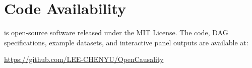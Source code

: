 \documentclass{article}
\begin{document}
\section*{Code Availability}

\oc{} is open-source software released under the MIT License. The code, DAG specifications, example datasets, and interactive panel outputs are available at:

\begin{center}
\url{https://github.com/LEE-CHENYU/OpenCausality}
\end{center}
\end{document}
